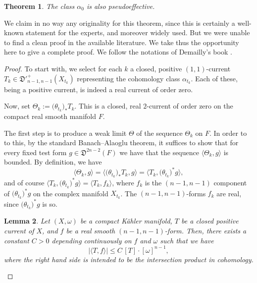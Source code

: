 \documentclass[11pt]{article}
\theoremstyle{plain}
\newtheorem{theorem}{Theorem}[section]
\newtheorem{lemma}[theorem]{Lemma}
\theoremstyle{definition}
\begin{document}
\begin{appendix}
\begin{theorem} \label{limitpseff}
The class $\alpha_0$ is also pseudoeffective.
\end{theorem}

We claim in no way any originality for this theorem, since this is certainly a well-known statement for the experts, and moreover widely used. But we were unable to find a clean proof in the available literature. We take thus the opportunity here to give a complete proof. We follow the notations of Demailly's book \cite{Dem12}.

\begin{proof}
To start with, we select for each $k$ a closed, positive $(1,1)$-current $T_{k}\in\mathfrak D'^+_{n-1,n-1}(X_{t_k})$ representing the cohomology class $\alpha_{t_k}$. Each of these, being a positive current, is indeed a real current of order zero.

Now, set $\Theta_{k}:=\bigl(\theta_{t_k}\bigr)_*T_k$. This is a closed, real $2$-current of order zero on the compact real smooth manifold $F$.

The first step is to produce a weak limit $\Theta$ of the sequence $\Theta_k$ on $F$. In order to to this, by the standard Banach--Alaoglu theorem, it suffices to show that for every fixed test form $g\in\mathfrak D^{2n-2}(F)$ we have that the sequence $\langle \Theta_k,g\rangle$ is bounded. By definition, we have
\[
\langle \Theta_k,g\rangle= \bigl\langle \bigl(\theta_{t_k}\bigr)_*T_k,g\bigr\rangle=\bigl\langle T_k,\bigl(\theta_{t_k}\bigr)^*g\bigr\rangle,
\]
and of course $\bigl\langle T_k,\bigl(\theta_{t_k}\bigr)^*g\bigr\rangle=\langle T_k,f_k\rangle$, where $f_k$ is the $(n-1,n-1)$ component of $\bigl(\theta_{t_k}\bigr)^*g$ on the complex manifold $X_{t_k}$. The $(n-1,n-1)$-forms $f_k$ are real, since $\bigl(\theta_{t_k}\bigr)^*g$ is so.

\begin{lemma}
Let $(X,\omega)$ be a compact Kähler manifold, $T$ be a closed positive current of $X$, and $f$ be a real smooth $(n-1,n-1)$-form. Then, there exists a constant $C>0$ depending continuously on $f$ and $\omega$ such that we have
\[
|\langle T, f\rangle|\le C\, [T]\cdot[\omega]^{n-1},
\]
where the right hand side is intended to be the intersection product in cohomology.
\end{lemma}


\end{proof}
\end{appendix}
\end{document}
